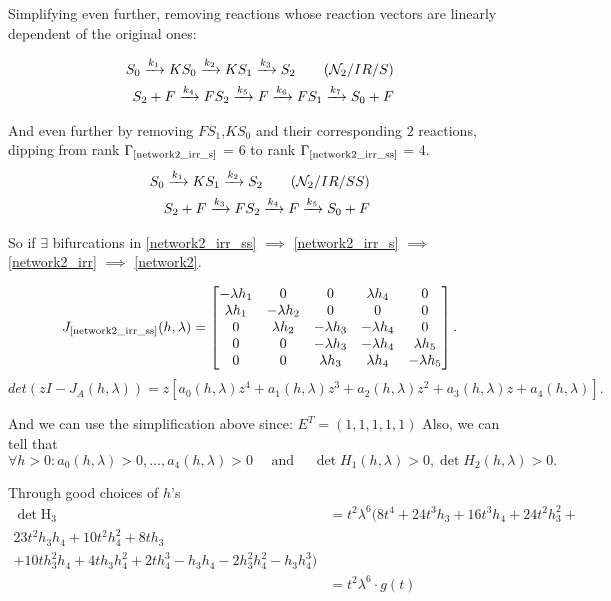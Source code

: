 \documentclass[aspectratio=169]{beamer}
\begin{document}
\begin{frame}
Simplifying even further, removing reactions whose reaction vectors are linearly dependent of the original ones:

\begin{align}\label{network2_irr_s}
	S_{0} \xrightarrow{k_1} KS_{0} \xrightarrow{k_2} K S_1 \xrightarrow{k_3} S_2 \tag{$\mathcal{N}_2 / IR / S$} \\
	S_{2} + F \xrightarrow{k_4} FS_{2} \xrightarrow{k_5} F \xrightarrow{k_6} FS_1 \xrightarrow{k_{7}} S_0 + F \notag
\end{align}

And even further by removing $FS_1$,$KS_0$ and their corresponding $2$ reactions, dipping from rank $\Gamma_{\text{\ref{network2_irr_s}}}$ = 6 to rank $\Gamma_{\text{\ref{network2_irr_ss}}}$ = 4.
\begin{align}\label{network2_irr_ss}
	S_{0} \xrightarrow{k_1} KS_{1} \xrightarrow{k_2} S_2 \tag{$\mathcal{N}_2 / IR / SS$} \\
	S_{2} + F \xrightarrow{k_3} FS_{2} \xrightarrow{k_4} F \xrightarrow{k_{5}} S_0 + F \notag
\end{align}

So if $\exists$ bifurcations in \ref{network2_irr_ss} $\implies$ \ref{network2_irr_s} $\implies$ \ref{network2_irr} $\implies$ \ref{network2}.
\end{frame}

\begin{frame}
\[
	J_{\text{\ref{network2_irr_ss}}}(h,\lambda)=
	\begin{bmatrix}-\lambda h_{1}&0&0&\lambda h_{4}&0\\\lambda h_{1}&-\lambda h_{2}&0&0&0\\0&\lambda h_{2}&-\lambda h_{3}&-\lambda h_{4}&0\\0&0&-\lambda h_{3}&-\lambda h_{4}&\lambda h_{5}\\0&0&\lambda h_{3}&\lambda h_{4}&-\lambda h_{5}
	\end{bmatrix}.
\]
\[
	det(zI-J_A(h,\lambda))=z[a_0(h,\lambda)z^4+a_1(h,\lambda)z^3+a_2(h,\lambda)z^2+a_3(h,\lambda)z+a_4(h,\lambda)].
\]

And we can use the simplification above since:
$E^T = \left(1,1,1,1,1\right)$
Also, we can tell that
\[
	\forall h > 0 : a_{0}(h,\lambda)>0,\ldots,a_{4}(h,\lambda)>0\quad \text{ and } \quad\det H_{1}(h,\lambda)>0,\det H_{2}(h,\lambda)>0.
\]

Through good choices of $h$'s
\begin{align*}
	\det \text{H}_3 &=
	t^2 \lambda^6
	(
		8t^4 + 24t^3h_3 + 16t^3h_4 + 24t^2h_3^2 + \\
		23t^2h_3h_4+ 10t^2h_4^2 + 8th_3 \\
		+ 10th_3^2h_4 + 4th_3h_4^2 +
		2th_4^3 - h_3h_4 - 2h_3^2h_4^2 - h_3h_4^3
	) \\
	&= 	t^2 \lambda^6 \cdot g(t)
\end{align*}

\end{frame}
\end{document}
